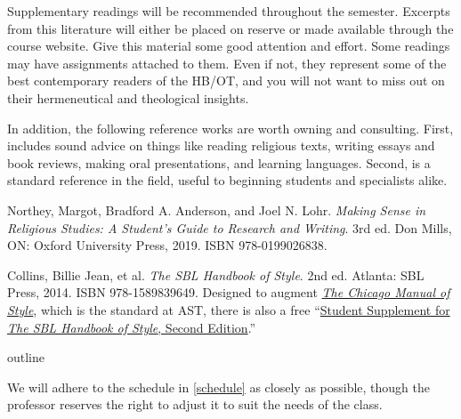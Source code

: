 \documentclass[titlepage]{article}
\begin{document}
Supplementary readings will be recommended throughout the semester.
Excerpts from this literature will either be placed on reserve or made
available through the course website. Give this material some good
attention and effort. Some readings may have assignments attached to
them. Even if not, they represent some of the best contemporary readers
of the HB/OT, and you will not want to miss out on their hermeneutical
and theological insights.

In addition, the following reference works are worth owning and
consulting. First, \cite{rlgs} includes sound advice on things like
reading religious texts, writing essays and book reviews, making oral
presentations, and learning languages. Second, \cite{sbl2} is a standard
reference in the field, useful to beginning students and specialists
alike.

\begingroup
\renewcommand{\section}[2]{}%
\begin{thebibliography}{Making Sense}%

	 Northey, Margot, Bradford A. Anderson, and Joel N. Lohr.
	\emph{Making Sense in Religious Studies: A Student's Guide to Research and Writing}.
	3rd ed. Don Mills, ON: Oxford University Press, 2019. ISBN 978-0199026838.

	 Collins, Billie Jean, et al.
	\emph{The SBL Handbook of Style}.
	2nd ed. Atlanta: SBL Press, 2014. ISBN 978-1589839649.
	Designed to augment \href{http://www.chicagomanualofstyle.org/home.html}{\emph{The Chicago Manual of Style}},
	which is the standard at AST, there is also a free
	“\href{https://www.sbl-site.org/assets/pdfs/pubs/SBLHSsupp2015-02.pdf}{Student Supplement for \emph{The SBL Handbook of Style}, Second Edition}.”

\end{thebibliography}
\endgroup



\section{Course Outline}
\label{outline}

We will adhere to the schedule in \autoref{schedule} as closely as
possible, though the professor reserves the right to adjust it to suit
the needs of the class.
\end{document}
